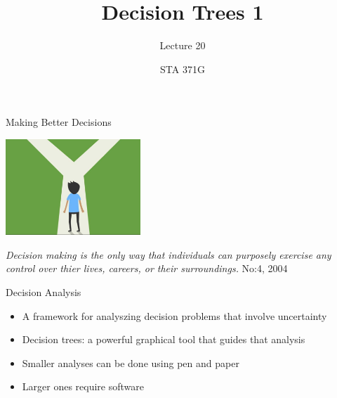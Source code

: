\documentclass{beamer}\usepackage[]{graphicx}\usepackage[]{color}
\title{Decision Trees 1}
\subtitle{Lecture 20}
\author{STA 371G}
\begin{document}
  
  

  \frame{\maketitle}



  \begin{darkframes}
    
    \begin{frame}{Making Better Decisions}
      \fontsize{10}{10}\selectfont
      \begin{center}
        \includegraphics[width=2in]{DecisionAnalysis.png} \\
      \end{center}
        \textit{Decision making is the only way that individuals can purposely
        exercise any control over thier lives, careers, or their surroundings.}
        No:4, 2004
      
      \lc %
    \end{frame}


    \begin{frame}[fragile]{Decision Analysis}
      \begin{itemize}[<+->]
        \item A framework for analyszing decision problems that involve uncertainty
        \item Decision trees: a powerful graphical tool that guides that analysis
        \item Smaller analyses can be done using pen and paper
        \item Larger ones require software 
        \end{itemize} 
    \end{frame}



\end{darkframes}
\end{document}
